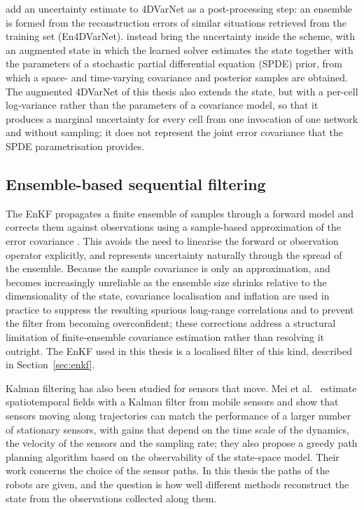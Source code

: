 \documentclass[english, 12pt, a4paper, elec, utf8, a-2b, online]{aaltothesis}
\begin{document}
\citeauthor{beauchamp2023en4dvarnet} \cite{beauchamp2023en4dvarnet} add an
uncertainty estimate to 4DVarNet as a post-processing step: an ensemble is
formed from the reconstruction errors of similar situations retrieved from the
training set (En4DVarNet). \citeauthor{beauchamp2024spde}
\cite{beauchamp2024spde} instead bring the uncertainty inside the scheme, with
an augmented state in which the learned solver estimates the state together with
the parameters of a stochastic partial differential equation (SPDE) prior, from which a
space- and time-varying covariance and posterior samples are obtained. The augmented
4DVarNet of this thesis also extends the state, but with a per-cell log-variance
rather than the parameters of a covariance model, so that it produces a marginal
uncertainty for every cell from one invocation of one network and without
sampling; it does not represent the joint error covariance that the SPDE
parametrisation provides.

\subsection{Ensemble-based sequential filtering}

The EnKF propagates a finite ensemble of
samples through a forward model and corrects them against observations
using a sample-based approximation of the error covariance
\cite{roth2017enkf}. This
avoids the need to linearise the forward or observation operator
explicitly, and represents uncertainty naturally through the spread
of the ensemble. Because the sample covariance is only an
approximation, and becomes increasingly unreliable as the ensemble
size shrinks relative to the dimensionality of the state, covariance
localisation and inflation \cite{roth2017enkf} are used in
practice to suppress the resulting spurious long-range correlations
and to prevent the filter from becoming overconfident; these
corrections address a structural limitation of finite-ensemble
covariance estimation rather than resolving it outright. The EnKF
used in this thesis is a localised filter of this kind, described in
Section~\ref{sec:enkf}.

Kalman filtering has also been studied for sensors that move. Mei et
al.\ \cite{mei2024mobile} estimate spatiotemporal fields with a Kalman
filter from mobile sensors and show that sensors moving along
trajectories can match the performance of a larger number of stationary
sensors, with gains that depend on the time scale of the dynamics, the
velocity of the sensors and the sampling rate; they also propose a
greedy path planning algorithm based on the observability of the
state-space model. Their work concerns the choice of the sensor paths.
In this thesis the paths of the robots are given, and the question is
how well different methods reconstruct the state from the observations
collected along them.
\end{document}
